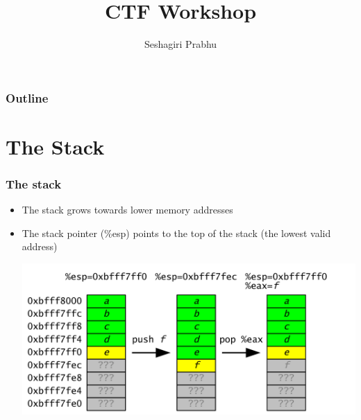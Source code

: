 \documentclass[12pt]{beamer}
\title{CTF Workshop}
\subtitle{}
\author{Seshagiri Prabhu}
\institute[Amrita Vishwa Vidyapeetham] %
{
  	\begin{center}
   	\begin{large}
	    Day 3\\
   	\end{large}
    	Amrita Vishwa Vidyapeetham\\
  		Amritapuri
  	\end{center}
}
\begin{document}
\frame{\titlepage}
\section*{}
\begin{frame}
	\frametitle{Outline}
  	\tableofcontents[section=1,hidesubsections]
\end{frame}




\section{The Stack}
	\begin{frame}{}
	\frametitle{The stack}
			\begin{itemize}
	    		\item The stack grows towards lower memory addresses
	    		\item The stack pointer (\%esp) points to the top of the stack (the
lowest valid address)
				\begin{center}
					\includegraphics[scale=0.24]{images/stack1.png} 
				\end{center}
  		\end{itemize}	
  	\end{frame}
 	
\end{document}
